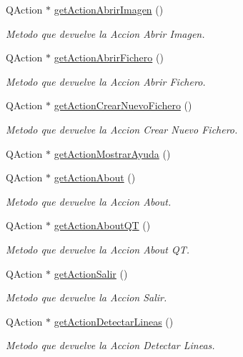 \begin{DoxyCompactItemize}
Q\+Action $\ast$ \hyperlink{classCAplicacion_a8016e78de08ca0dfb1e74750a0fcacf1}{get\+Action\+Abrir\+Imagen} ()
\begin{DoxyCompactList}\small\item\em Metodo que devuelve la Accion Abrir Imagen. \end{DoxyCompactList}\item 
Q\+Action $\ast$ \hyperlink{classCAplicacion_adf620887eb4c888ec7bbe1178df9d307}{get\+Action\+Abrir\+Fichero} ()
\begin{DoxyCompactList}\small\item\em Metodo que devuelve la Accion Abrir Fichero. \end{DoxyCompactList}\item 
Q\+Action $\ast$ \hyperlink{classCAplicacion_ac1649d2d73a2fbf186a8ed8e50049562}{get\+Action\+Crear\+Nuevo\+Fichero} ()
\begin{DoxyCompactList}\small\item\em Metodo que devuelve la Accion Crear Nuevo Fichero. \end{DoxyCompactList}\item 
Q\+Action $\ast$ \hyperlink{classCAplicacion_ac71d3f010835578a63883dcc040fa979}{get\+Action\+Mostrar\+Ayuda} ()
\item 
Q\+Action $\ast$ \hyperlink{classCAplicacion_a46ac4ceff3c82283f159c467a5cde6d2}{get\+Action\+About} ()
\begin{DoxyCompactList}\small\item\em Metodo que devuelve la Accion About. \end{DoxyCompactList}\item 
Q\+Action $\ast$ \hyperlink{classCAplicacion_a8f0d5c5ad866644453dcedb5a45c2044}{get\+Action\+About\+QT} ()
\begin{DoxyCompactList}\small\item\em Metodo que devuelve la Accion About QT. \end{DoxyCompactList}\item 
Q\+Action $\ast$ \hyperlink{classCAplicacion_a0326521d3aacf2c129f8b63ce6dd51b1}{get\+Action\+Salir} ()
\begin{DoxyCompactList}\small\item\em Metodo que devuelve la Accion Salir. \end{DoxyCompactList}\item 
Q\+Action $\ast$ \hyperlink{classCAplicacion_a44d0d263883784b27191c34493a56154}{get\+Action\+Detectar\+Lineas} ()
\begin{DoxyCompactList}\small\item\em Metodo que devuelve la Accion Detectar Lineas. \end{DoxyCompactList}\item 

\end{DoxyCompactItemize}
